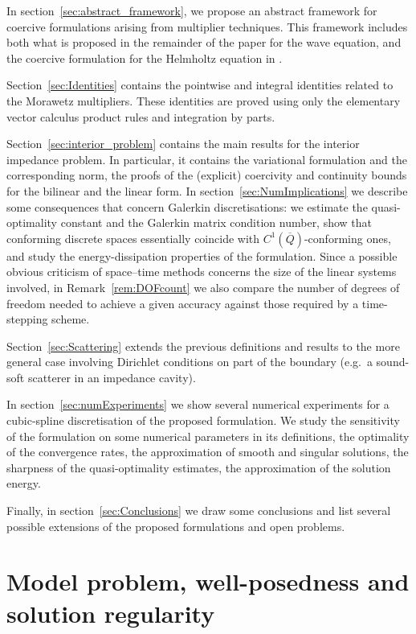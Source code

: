 \documentclass[a4paper]{article}
\theoremstyle{plain}
\theoremstyle{definition}
\begin{document}
In section~\ref{sec:abstract_framework}, we propose an abstract framework for coercive formulations arising from multiplier techniques.
This framework includes both what is proposed in the remainder of the paper for the wave equation, and the coercive formulation for the Helmholtz equation in \cite{Moiola2014}.

Section~\ref{sec:Identities} contains the pointwise and integral identities related to the Morawetz multipliers.
These identities are proved using only the elementary vector calculus product rules and integration by parts.

Section~\ref{sec:interior_problem} contains the main results for the interior impedance problem.
In particular, it contains the variational formulation and the corresponding norm, the proofs of the (explicit) coercivity and continuity bounds for the bilinear and the linear form.
In section~\ref{sec:NumImplications} we describe some consequences that concern Galerkin discretisations: we estimate the quasi-optimality constant and the Galerkin matrix condition number, show that conforming discrete spaces essentially coincide with $C^1(\overline Q)$-conforming ones, and study the energy-dissipation properties of the formulation.
Since a possible obvious criticism of space--time methods concerns the size of the linear systems involved, in Remark~\ref{rem:DOFcount} we also compare the number of degrees of freedom needed to achieve a given accuracy against those required by a time-stepping scheme.

Section~\ref{sec:Scattering} extends the previous definitions and results to the more general case involving Dirichlet conditions on part of the boundary (e.g.\ a sound-soft scatterer in an impedance cavity).

In section~\ref{sec:numExperiments} we show several numerical experiments for a cubic-spline discretisation of the proposed formulation.
We study the sensitivity of the formulation on some numerical parameters in its definitions, the optimality of the convergence rates, the approximation of smooth and singular solutions, the sharpness of the quasi-optimality estimates, the approximation of the solution energy.

Finally, in section~\ref{sec:Conclusions} we draw some conclusions and list several possible extensions of the proposed formulations and open problems.


\section{Model problem, well-posedness and solution regularity}\label{sec:IBVPandRegularity}
\end{document}
